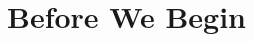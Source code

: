 \documentclass[../main]{subfiles}
\begin{document}
\chapter{Before We Begin} \label{chp:}








\end{document}
